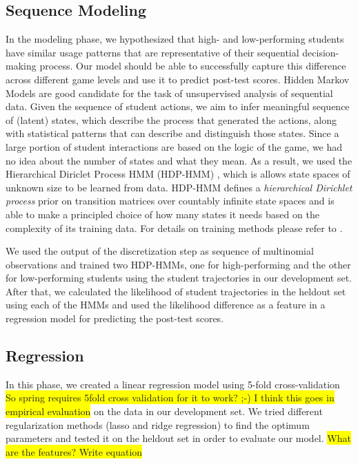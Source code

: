 \documentclass{sigchi}
\newcommand{\hl}[1]{\colorbox{yellow}{#1}}
\begin{document}
\subsection{Sequence Modeling}
In the modeling phase, we hypothesized that high- and low-performing students have similar usage patterns that are representative of their sequential decision-making process. 
Our model should be able to successfully capture this difference across different game levels and use it to predict post-test scores.
Hidden Markov Models are good candidate for the task of unsupervised analysis of sequential data.
Given the sequence of student actions, we aim to infer meaningful sequence of (latent) states, which describe the process that generated the actions, along with statistical patterns that can describe and distinguish those states.
Since a large portion of student interactions are based on the logic of the game, we had no idea about the number of states and what they mean.
As a result, we used the Hierarchical Diriclet Process HMM (HDP-HMM) \cite{fox2008hdp}, which is allows state spaces of unknown size to be learned from data. 
HDP-HMM defines a \textit{hierarchical Dirichlet process} prior on transition matrices over countably infinite state spaces and is able to make a principled choice of how many states it needs based on the complexity of its training data. 
For details on training methods please refer to \cite{fox2008hdp}.

We used the output of the discretization step as sequence of multinomial observations and trained two HDP-HMMs, one for high-performing and the other for low-performing students using the student trajectories in our development set. After that, we calculated the likelihood of student trajectories in the heldout set using each of the HMMs and used the likelihood difference as a feature in a regression model for predicting the post-test scores.

\subsection{Regression}

In this phase, we created a linear regression model using 5-fold cross-validation \hl{So spring requires 5fold cross validation for it to work? ;-) I think this goes in empirical evaluation} on the data in our development set. We tried different regularization methods (lasso and ridge regression) to find the optimum parameters and tested it on the heldout set in order to evaluate our model. 
\hl{What are the features? Write equation}
\end{document}
